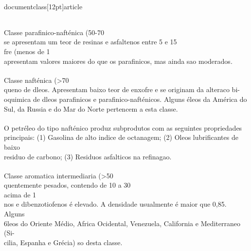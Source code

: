 \\documentclass[12pt]{article}
\begin{document}
{\\
Classe parafinico-nafténica (50-70\\%
se apresentam um teor de resinas e asfaltenos entre 5 e 15\\%
fre (menos de 1\\%
apresentam valores maiores do que os parafinicos, mas ainda sao moderados.\\
\\
Classe nafténica (>70\\%
queno de dleos. Apresentam baixo teor de enxofre e se originam da alteraco bi-\\
oquimica de dleos parafinicos e parafinico-nafténicos. Alguns éleos da América do\\
Sul, da Russia e do Mar do Norte pertencem a esta classe.\\
\\
O petréleo do tipo nafténico produz subprodutos com as seguintes propriedades\\
principais: (1) Gasolina de alto indice de octanagem; (2) Oleos lubrificantes de baixo\\
residuo de carbono; (3) Residuos asfalticos na refinagao.\\
\\
Classe aromatica intermediaria (>50\\%
quentemente pesados, contendo de 10 a 30\\%
acima de 1\\%
nos e dibenzotiofenos é elevado. A densidade usualmente é maior que 0,85. Alguns\\
6leos do Oriente Médio, Africa Ocidental, Venezuela, California e Mediterraneo (Si-\\
cilia, Espanha e Grécia) so desta classe.\\
\\
}
\end{document}
